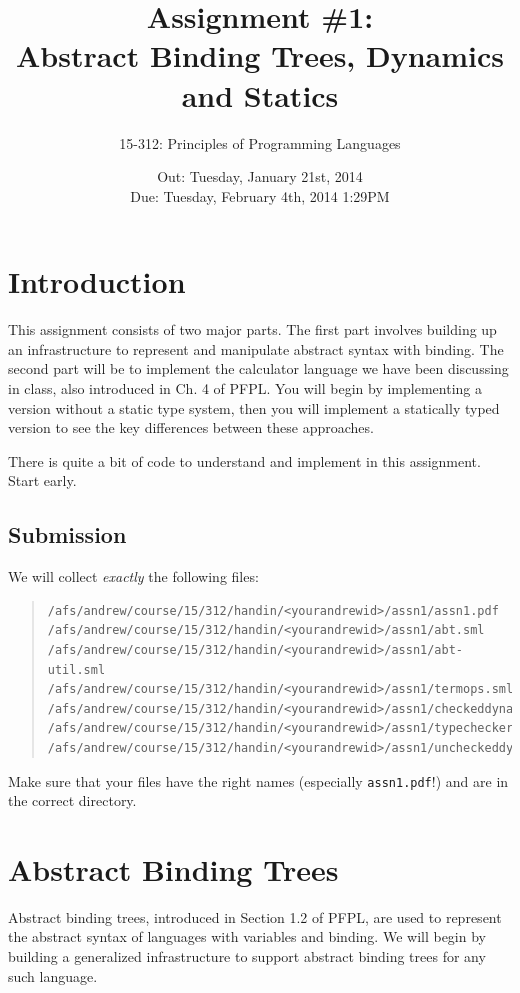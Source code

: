 \documentclass[11pt]{article}
\title{Assignment \#1: \\
        Abstract Binding Trees, Dynamics and Statics}
\author{15-312: Principles of Programming Languages}
\date{Out: Tuesday, January 21st, 2014\\
      Due: Tuesday, February 4th, 2014 1:29PM}
\begin{document}
\maketitle
\section*{Introduction}

This assignment consists of two major parts. The first part involves building up an infrastructure to represent and manipulate abstract syntax with binding. The second part will be to implement the calculator language we have been discussing in class, also introduced in Ch. 4 of PFPL. You will begin by implementing a version without a static type system, then you will implement a statically typed version to see the key differences between these approaches.

There is quite a bit of code to understand and implement in this assignment. Start early.

\subsection{Submission}
We will collect {\it exactly} the following files:
\begin{quote}
\begin{verbatim}
/afs/andrew/course/15/312/handin/<yourandrewid>/assn1/assn1.pdf
/afs/andrew/course/15/312/handin/<yourandrewid>/assn1/abt.sml
/afs/andrew/course/15/312/handin/<yourandrewid>/assn1/abt-util.sml
/afs/andrew/course/15/312/handin/<yourandrewid>/assn1/termops.sml
/afs/andrew/course/15/312/handin/<yourandrewid>/assn1/checkeddynamics.sml
/afs/andrew/course/15/312/handin/<yourandrewid>/assn1/typechecker.sml
/afs/andrew/course/15/312/handin/<yourandrewid>/assn1/uncheckeddynamics.sml
\end{verbatim}
\end{quote}
Make sure that your files have the right names (especially
\verb'assn1.pdf'!) and are in the correct directory.

\section{Abstract Binding Trees}
Abstract binding trees, introduced in Section 1.2 of PFPL, are used to represent the abstract syntax of languages with variables and binding. We will begin by building a generalized infrastructure to support abstract binding trees for any such language.
\end{document}
